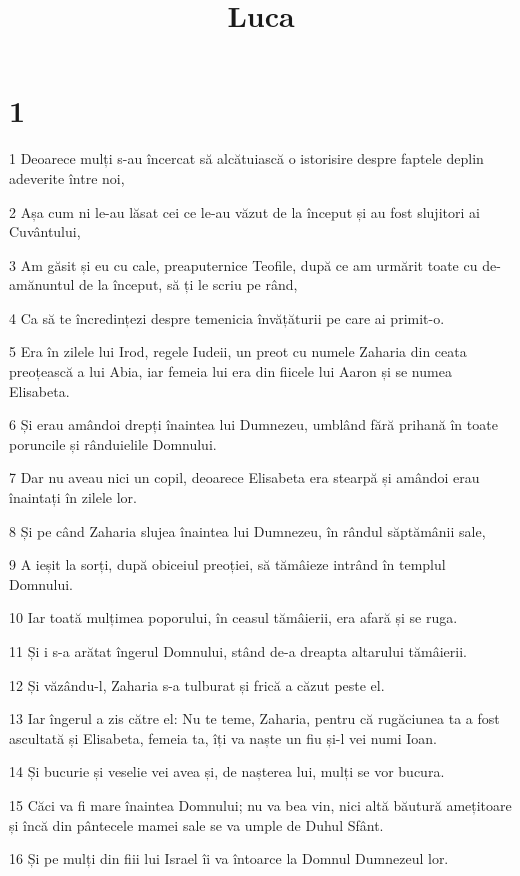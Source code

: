 

\title{Luca}


\chapter{1}

\par 1 Deoarece mulți s-au încercat să alcătuiască o istorisire despre faptele deplin adeverite între noi,
\par 2 Așa cum ni le-au lăsat cei ce le-au văzut de la început și au fost slujitori ai Cuvântului,
\par 3 Am găsit și eu cu cale, preaputernice Teofile, după ce am urmărit toate cu de-amănuntul de la început, să ți le scriu pe rând,
\par 4 Ca să te încredințezi despre temenicia învățăturii pe care ai primit-o.
\par 5 Era în zilele lui Irod, regele Iudeii, un preot cu numele Zaharia din ceata preoțească a lui Abia, iar femeia lui era din fiicele lui Aaron și se numea Elisabeta.
\par 6 Și erau amândoi drepți înaintea lui Dumnezeu, umblând fără prihană în toate poruncile și rânduielile Domnului.
\par 7 Dar nu aveau nici un copil, deoarece Elisabeta era stearpă și amândoi erau înaintați în zilele lor.
\par 8 Și pe când Zaharia slujea înaintea lui Dumnezeu, în rândul săptămânii sale,
\par 9 A ieșit la sorți, după obiceiul preoției, să tămâieze intrând în templul Domnului.
\par 10 Iar toată mulțimea poporului, în ceasul tămâierii, era afară și se ruga.
\par 11 Și i s-a arătat îngerul Domnului, stând de-a dreapta altarului tămâierii.
\par 12 Și văzându-l, Zaharia s-a tulburat și frică a căzut peste el.
\par 13 Iar îngerul a zis către el: Nu te teme, Zaharia, pentru că rugăciunea ta a fost ascultată și Elisabeta, femeia ta, îți va naște un fiu și-l vei numi Ioan.
\par 14 Și bucurie și veselie vei avea și, de nașterea lui, mulți se vor bucura.
\par 15 Căci va fi mare înaintea Domnului; nu va bea vin, nici altă băutură amețitoare și încă din pântecele mamei sale se va umple de Duhul Sfânt.
\par 16 Și pe mulți din fiii lui Israel îi va întoarce la Domnul Dumnezeul lor.
